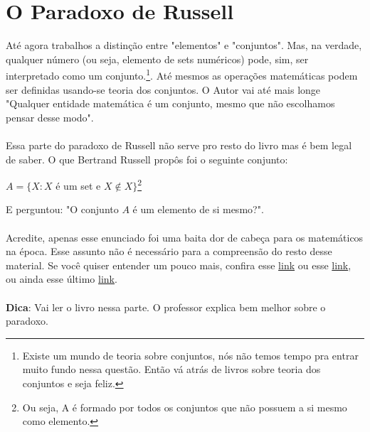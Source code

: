 \documentclass[main.tex]{subfiles}
\begin{document}
\section{O Paradoxo de Russell}

Até agora trabalhos a distinção entre "elementos" e "conjuntos". Mas, na verdade, qualquer número (ou seja, elemento de sets numéricos) pode, sim, ser interpretado como um conjunto.\footnote{Existe um mundo de teoria sobre conjuntos, nós não temos tempo pra entrar muito fundo nessa questão. Então vá atrás de livros sobre teoria dos conjuntos e seja feliz.}. Até mesmos as operações matemáticas podem ser definidas usando-se teoria dos conjuntos. O Autor vai até mais longe "Qualquer entidade matemática é um conjunto, mesmo que não escolhamos pensar desse modo".
\\~\\
Essa parte do paradoxo de Russell não serve pro resto do livro mas é bem legal de saber. O que Bertrand Russell propôs foi o seguinte conjunto:
\begin{center}
	$ A = \{ X : X $ é um set e $X \notin X \}$\footnote{Ou seja, A é formado por todos os conjuntos que não possuem a si mesmo como elemento.}
\end{center}
E perguntou: "O conjunto $A$ é um elemento de si mesmo?".
\\~\\
Acredite, apenas esse enunciado foi uma baita dor de cabeça para os matemáticos na época. Esse assunto não é necessário para a compreensão do resto desse material. Se você quiser entender um pouco mais, confira esse \href{https://www.youtube.com/watch?v=AQTTYAM8BF0}{link} ou esse \href{https://www.youtube.com/watch?v=0Bs0lJRxOaI}{link}, ou ainda esse último \href{https://www.youtube.com/watch?v=HeQX2HjkcNo}{link}.
\\~\\
\textbf{Dica}: Vai ler o livro nessa parte. O professor explica bem melhor sobre o paradoxo.

\end{document}
